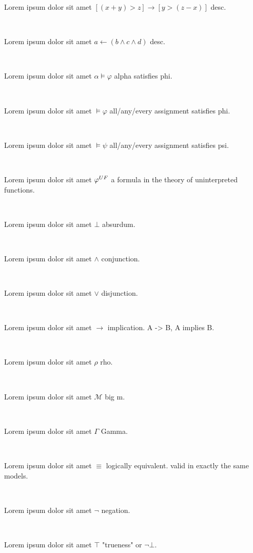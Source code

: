 \documentclass[12pt]{article}
\begin{document}
Lorem ipsum dolor sit amet $ [ ( x + y ) > z ] \rightarrow [ y > ( z - x ) ] $ desc.

\centerline{~}


Lorem ipsum dolor sit amet $ a \leftarrow ( b \wedge c \wedge d )  $ desc.

\centerline{~}

Lorem ipsum dolor sit amet $ \alpha \vDash \varphi $ alpha satisfies phi.

\centerline{~}

Lorem ipsum dolor sit amet $ \vDash \varphi $ all/any/every assignment satisfies phi.

\centerline{~}

Lorem ipsum dolor sit amet $ \vDash \psi $ all/any/every assignment satisfies psi.

\centerline{~}

Lorem ipsum dolor sit amet $ \varphi^{\scriptsize UF} $ a formula in the theory of uninterpreted functions.

\centerline{~}

Lorem ipsum dolor sit amet $ \bot $ absurdum.

\centerline{~}

Lorem ipsum dolor sit amet $ \wedge $ conjunction.

\centerline{~}

Lorem ipsum dolor sit amet $ \vee $ disjunction.

\centerline{~}

Lorem ipsum dolor sit amet $ \rightarrow $ implication.  A -> B,  A implies B.

\centerline{~}

Lorem ipsum dolor sit amet $ \rho $ rho.

\centerline{~}

Lorem ipsum dolor sit amet $ \mathcal{M} $ big m.

\centerline{~}

Lorem ipsum dolor sit amet $ \Gamma $ Gamma.

\centerline{~}

Lorem ipsum dolor sit amet $ \equiv $ logically equivalent. valid in exactly the same models.

\centerline{~}

Lorem ipsum dolor sit amet $ \neg $ negation.

\centerline{~}

Lorem ipsum dolor sit amet $ \top $ "trueness" or $ \neg \bot $.

\centerline{~}
\end{document}
